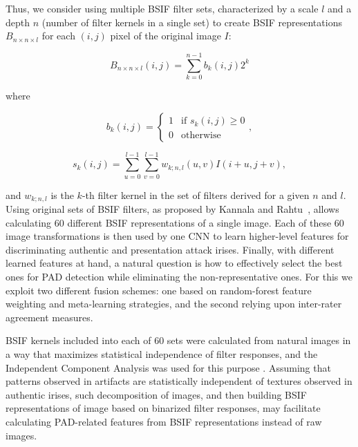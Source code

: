 Thus, we consider using multiple BSIF filter sets, characterized by a scale $l$ and a depth $n$ (number of filter kernels in a single set) to create BSIF representations $B_{n\times n \times l}$ for each $(i,j)$ pixel of the original image $I$:

$$
B_{n\times n \times l}(i,j) = \sum_{k=0}^{n-1}b_k(i,j)2^k
$$

where

$$
b_k(i,j) =  
\begin{cases}
    1 & \text{if } s_k(i,j) \geq 0\\
    0 & \text{otherwise}
  \end{cases},
$$

$$
s_k(i,j) = \sum_{u=0}^{l-1}\sum_{v=0}^{l-1} w_{k;n,l}(u,v) I(i+u,j+v),
$$

\noindent
and $w_{k;n,l}$ is the $k$-th filter kernel in the set of filters derived for a given $n$ and $l$. Using original sets of BSIF filters, as proposed by Kannala and Rahtu~\cite{kannala2012bsif}, allows calculating 60 different BSIF representations of a single image. Each of these 60 image transformations is then used by one CNN to learn higher-level features for discriminating authentic and presentation attack irises. Finally, with different learned features at hand, a natural question is how to effectively select the best ones for PAD detection while eliminating the non-representative ones. For this we exploit two different fusion schemes: one based on random-forest feature weighting and meta-learning strategies, and the second relying upon inter-rater agreement measures.


BSIF kernels included into each of 60 sets were calculated from natural images in a way that maximizes statistical independence of filter responses, and the Independent Component Analysis was used for this purpose \cite{kannala2012bsif}. Assuming that patterns observed in artifacts are statistically independent of textures observed in authentic irises, such decomposition of images, and then building BSIF representations of image based on binarized filter responses, may facilitate calculating PAD-related features from BSIF representations instead of raw images.

